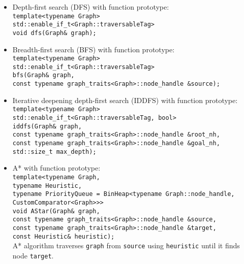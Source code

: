 \documentclass{article}
\begin{document}
\begin{itemize}
	\item Depth-first search (DFS) with function prototype:\\
		\texttt{template<typename Graph>\\
		std::enable\_if\_t<Graph::traversableTag>\\
		void dfs(Graph\& graph);}
	\item Breadth-first search (BFS) with function prototype:\\
		\texttt{template<typename Graph>\\
		std::enable\_if\_t<Graph::traversableTag>\\
		bfs(Graph\& graph,\\\hspace*{2em}
		const typename graph\_traits<Graph>::node\_handle
				 \&source);}
	\item Iterative deepening depth-first search (IDDFS) with function prototype:\\
		\texttt{template<typename Graph>\\
		std::enable\_if\_t<Graph::traversableTag, bool>\\
		iddfs(Graph\& graph,\\\hspace*{3em}
		const typename graph\_traits<Graph>::node\_handle \&root\_nh,\\\hspace*{3em}
		const typename graph\_traits<Graph>::node\_handle \&goal\_nh,\\\hspace*{3em}
	std::size\_t max\_depth);}
	\item A* with function prototype:\\
		\texttt{template<typename Graph,\\\hspace*{4.75em}typename
			Heuristic,\\\hspace*{4.75em}
			typename PriorityQueue = BinHeap<typename Graph::node\_handle,\\\hspace*{21.4em}
			CustomComparator<Graph>>>\\
			void AStar(Graph\& graph,\\\hspace*{5.27em}
			const typename graph\_traits<Graph>::node\_handle \&source,\\\hspace*{5.27em}
			const typename graph\_traits<Graph>::node\_handle \&target,\\\hspace*{5.27em}
			const Heuristic\& heuristic);}\\
		A* algorithm traverses \texttt{graph} from \texttt{source} using \texttt{heuristic} until it finds node \texttt{target}.
\end{itemize}
\end{document}
